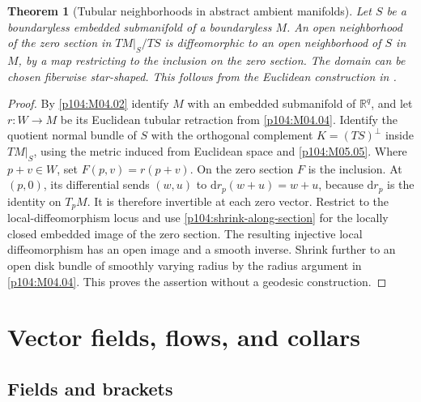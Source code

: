 \documentclass[11pt,oneside,openany]{book}
\newtheorem{theorem}{Theorem}[chapter]
\theoremstyle{definition}
\theoremstyle{remark}
\newcommand{\R}{\mathbb R}
\newcommand{\dd}{\mathrm d}
\begin{document}
\begin{theorem}[Tubular neighborhoods in abstract ambient manifolds]\label{p104:M05.08}
Let \(S\) be a boundaryless embedded submanifold of a boundaryless \(M\). An open neighborhood of the zero section in \(TM|_S/TS\) is diffeomorphic to an open neighborhood of \(S\) in \(M\), by a map restricting to the inclusion on the zero section. The domain can be chosen fiberwise star-shaped. This follows from the Euclidean construction in \cite[Theorems 6.15 and 6.24 and Proposition 6.25]{lee}.
\end{theorem}
\begin{proof}
By \cref{p104:M04.02} identify \(M\) with an embedded submanifold of \(\R^q\), and let \(r:W\to M\) be its Euclidean tubular retraction from \cref{p104:M04.04}. Identify the quotient normal bundle of \(S\) with the orthogonal complement \(K=(TS)^\perp\) inside \(TM|_S\), using the metric induced from Euclidean space and \cref{p104:M05.05}. Where \(p+v\in W\), set \(F(p,v)=r(p+v)\). On the zero section \(F\) is the inclusion. At \((p,0)\), its differential sends \((w,u)\) to \(\dd r_p(w+u)=w+u\), because \(\dd r_p\) is the identity on \(T_pM\). It is therefore invertible at each zero vector. Restrict to the local-diffeomorphism locus and use \cref{p104:shrink-along-section} for the locally closed embedded image of the zero section. The resulting injective local diffeomorphism has an open image and a smooth inverse. Shrink further to an open disk bundle of smoothly varying radius by the radius argument in \cref{p104:M04.04}. This proves the assertion without a geodesic construction.
\end{proof}
\chapter{Vector fields, flows, and collars}

\section{Fields and brackets}
\end{document}
